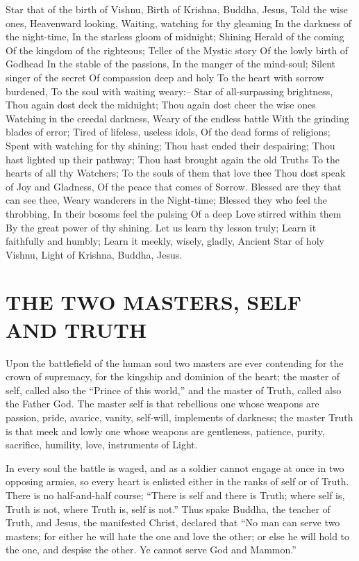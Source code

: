 \documentclass[12pt,oneside]{scrbook}
\begin{document}
  Star that of the birth of Vishnu, Birth of Krishna, Buddha, Jesus, Told
  the wise ones, Heavenward looking, Waiting, watching for thy gleaming In
  the darkness of the night-time, In the starless gloom of midnight;
  Shining Herald of the coming Of the kingdom of the righteous; Teller of
  the Mystic story Of the lowly birth of Godhead In the stable of the
  passions, In the manger of the mind-soul; Silent singer of the secret Of
  compassion deep and holy To the heart with sorrow burdened, To the soul
  with waiting weary:-- Star of all-surpassing brightness, Thou again dost
  deck the midnight; Thou again dost cheer the wise ones Watching in the
  creedal darkness, Weary of the endless battle With the grinding blades
  of error; Tired of lifeless, useless idols, Of the dead forms of
  religions; Spent with watching for thy shining; Thou hast ended their
  despairing; Thou hast lighted up their pathway; Thou hast brought again
  the old Truths To the hearts of all thy Watchers; To the souls of them
  that love thee Thou dost speak of Joy and Gladness, Of the peace that
  comes of Sorrow. Blessed are they that can see thee, Weary wanderers in
  the Night-time; Blessed they who feel the throbbing, In their bosoms
  feel the pulsing Of a deep Love stirred within them By the great power
  of thy shining. Let us learn thy lesson truly; Learn it faithfully and
  humbly; Learn it meekly, wisely, gladly, Ancient Star of holy Vishnu,
  Light of Krishna, Buddha, Jesus.
  
  \section{THE TWO MASTERS, SELF AND
  TRUTH}\label{the-two-masters-self-and-truth}
  
  Upon the battlefield of the human soul two masters are ever contending
  for the crown of supremacy, for the kingship and dominion of the heart;
  the master of self, called also the ``Prince of this world,'' and the
  master of Truth, called also the Father God. The master self is that
  rebellious one whose weapons are passion, pride, avarice, vanity,
  self-will, implements of darkness; the master Truth is that meek and
  lowly one whose weapons are gentleness, patience, purity, sacrifice,
  humility, love, instruments of Light.
  
  In every soul the battle is waged, and as a soldier cannot engage at
  once in two opposing armies, so every heart is enlisted either in the
  ranks of self or of Truth. There is no half-and-half course; ``There is
  self and there is Truth; where self is, Truth is not, where Truth is,
  self is not.'' Thus spake Buddha, the teacher of Truth, and Jesus, the
  manifested Christ, declared that ``No man can serve two masters; for
  either he will hate the one and love the other; or else he will hold to
  the one, and despise the other. Ye cannot serve God and Mammon.''
  
\end{document}
